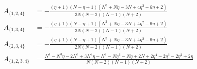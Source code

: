 \documentclass[11pt]{article}
\begin{document}
\begin{align*}
  A_{\{1,2,4\}} &= - \frac{\left(\eta + 1\right) \left(N - \eta + 1\right) \left(N^{2} + N \eta - 3 N + 4 \eta^{2} - 6 \eta + 2\right)}{2 N \left(N - 2\right) \left(N - 1\right) \left(N + 2\right)} \\
  A_{\{1,3,4\}} &= - \frac{\left(\eta + 1\right) \left(N - \eta + 1\right) \left(N^{2} + N \eta - 3 N + 4 \eta^{2} - 6 \eta + 2\right)}{2 N \left(N - 2\right) \left(N - 1\right) \left(N + 2\right)} \\
  A_{\{2,3,4\}} &= - \frac{\left(\eta + 1\right) \left(N - \eta + 1\right) \left(N^{2} + N \eta - 3 N + 4 \eta^{2} - 6 \eta + 2\right)}{2 N \left(N - 2\right) \left(N - 1\right) \left(N + 2\right)} \\
  A_{\{1,2,3,4\}} &= \frac{N^{4} - N^{3} \eta - 2 N^{3} + 3 N^{2} \eta - N^{2} - N \eta^{3} - N \eta + 2 N + 2 \eta^{4} - 2 \eta^{3} - 2 \eta^{2} + 2 \eta}{N \left(N - 2\right) \left(N - 1\right) \left(N + 2\right)} 
\end{align*}
\end{document}
